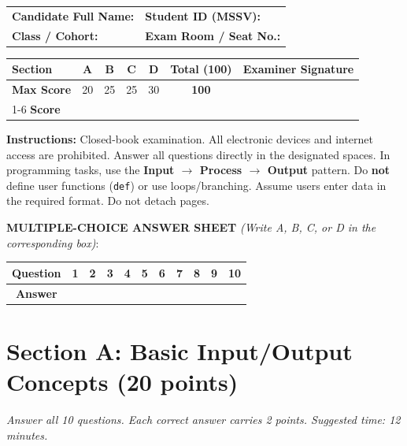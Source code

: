 \documentclass[11pt,a4paper]{article}
\begin{document}
\begin{headerbox}
\begin{tabular*}{\textwidth}{@{\extracolsep{\fill}}ll@{}}
  \textbf{Candidate Full Name:} \dotfill & \textbf{Student ID (MSSV):} \dotfill \\[0.25em]
  \textbf{Class / Cohort:} \dotfill & \textbf{Exam Room / Seat No.:} \dotfill
\end{tabular*}

\vspace{0.25em}
\renewcommand{\arraystretch}{1.1}
\setlength{\tabcolsep}{4.5pt}
\centering
\begin{tabular}{|l|c|c|c|c||c|c|}
\hline
\textbf{Section} & \textbf{A} & \textbf{B} & \textbf{C} & \textbf{D} & \textbf{Total (100)} & \textbf{Examiner Signature} \\
\hline
\textbf{Max Score} & 20 & 25 & 25 & 30 & \textbf{100} & \\[0.35em]
\cline{1-6}
\textbf{Score} & & & & & & \\[0.45em]
\hline
\end{tabular}

\vspace{0.2em}
\raggedright
\scriptsize
\textbf{Instructions:} Closed-book examination. All electronic devices and internet access are prohibited. Answer all questions directly in the designated spaces. In programming tasks, use the \textbf{Input $\rightarrow$ Process $\rightarrow$ Output} pattern. Do \textbf{not} define user functions (\texttt{def}) or use loops/branching. Assume users enter data in the required format. Do not detach pages.
\end{headerbox}

\vspace{1mm}
\noindent
\textbf{MULTIPLE-CHOICE ANSWER SHEET} \textit{(Write A, B, C, or D in the corresponding box)}:
\begin{center}
\setlength{\tabcolsep}{5pt}
\renewcommand{\arraystretch}{1.05}
\begin{tabular}{|c|c|c|c|c|c|c|c|c|c|c|}
\hline
\textbf{Question} & \textbf{1} & \textbf{2} & \textbf{3} & \textbf{4} & \textbf{5} & \textbf{6} & \textbf{7} & \textbf{8} & \textbf{9} & \textbf{10} \\
\hline
\textbf{Answer} & & & & & & & & & & \\[2mm]
\hline
\end{tabular}
\end{center}
\vspace{-2mm}
\section*{Section A: Basic Input/Output Concepts \hfill \normalsize\normalfont(20 points)}
\textit{Answer all 10 questions. Each correct answer carries 2 points. Suggested time: 12 minutes.}
\end{document}
